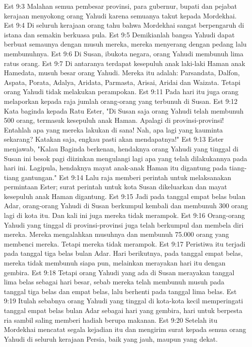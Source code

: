 Est 9:3  Malahan semua pembesar provinsi, para gubernur, bupati dan pejabat kerajaan menyokong orang Yahudi karena semuanya takut kepada Mordekhai.
Est 9:4  Di seluruh kerajaan orang tahu bahwa Mordekhai sangat berpengaruh di istana dan semakin berkuasa pula.
Est 9:5  Demikianlah bangsa Yahudi dapat berbuat semaunya dengan musuh mereka, mereka menyerang dengan pedang lalu membunuhnya.
Est 9:6  Di Susan, ibukota negara, orang Yahudi membunuh lima ratus orang.
Est 9:7  Di antaranya terdapat kesepuluh anak laki-laki Haman anak Hamedata, musuh besar orang Yahudi. Mereka itu adalah: Parsandata, Dalfon, Aspata, Porata, Adalya, Aridata, Parmasta, Arisai, Aridai dan Waizata. Tetapi orang Yahudi tidak melakukan perampokan.
Est 9:11  Pada hari itu juga orang melaporkan kepada raja jumlah orang-orang yang terbunuh di Susan.
Est 9:12  Kata baginda kepada Ratu Ester, "Di Susan saja orang Yahudi telah membunuh 500 orang, termasuk kesepuluh anak Haman. Apalagi di provinsi-provinsi! Entahlah apa yang mereka lakukan di sana! Nah, apa lagi yang kauminta sekarang? Katakan saja, engkau pasti akan mendapatnya!"
Est 9:13  Ester menjawab, "Kalau Baginda berkenan, hendaknya orang Yahudi yang tinggal di Susan ini besok pagi diizinkan mengulangi lagi apa yang telah dilakukannya pada hari ini. Lagipula, hendaknya mayat anak-anak Haman itu digantung pada tiang-tiang gantungan."
Est 9:14  Lalu raja memberi perintah untuk melaksanakan permintaan Ester; surat perintah untuk kota Susan dikeluarkan dan mayat kesepuluh anak Haman digantung.
Est 9:15  Jadi pada tanggal empat belas bulan Adar, orang-orang Yahudi di Susan berkumpul kembali dan membunuh 300 orang lagi di kota itu. Dan kali ini juga mereka tidak merampok.
Est 9:16  Orang-orang Yahudi yang tinggal di provinsi-provinsi juga telah berkumpul dan membela diri mereka. Mereka mengalahkan musuhnya dan membunuh 75.000 orang yang membenci mereka. Tetapi mereka tidak merampok.
Est 9:17  Peristiwa itu terjadi pada tanggal tiga belas bulan Adar. Hari berikutnya, pada tanggal empat belas, mereka tidak membunuh siapa pun, melainkan merayakan hari itu dengan gembira.
Est 9:18  Tetapi orang Yahudi yang ada di Susan merayakan tanggal lima belas sebagai hari besar, sebab mereka telah membunuh musuh pada tanggal tiga belas dan empat belas, lalu berhenti pada tanggal lima belas.
Est 9:19  Itulah sebabnya orang Yahudi yang tinggal di kota-kota kecil memperingati tanggal empat belas bulan Adar sebagai hari yang gembira, hari untuk berpesta ria sambil saling memberi hadiah berupa makanan.
Est 9:20  Setelah itu Mordekhai mencatat segala kejadian itu dan mengirim surat kepada semua orang Yahudi di seluruh kerajaan Persia, baik yang jauh, maupun yang dekat.
